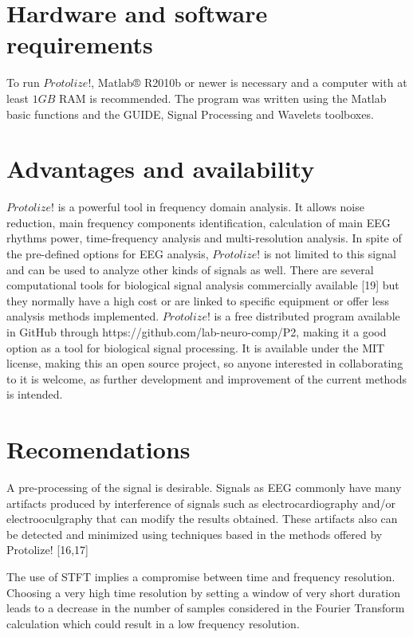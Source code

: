 \documentclass[12pt, a4paper]{article}
\begin{document}
\section{Hardware and software requirements}

To run $Protolize!$, Matlab® R2010b or newer is necessary and a computer with at least $1GB$ RAM is recommended. The program was written using the Matlab basic functions and the GUIDE, Signal Processing and Wavelets toolboxes.

\section{Advantages and availability}

$Protolize!$ is a powerful tool in frequency domain analysis. It allows noise reduction, main frequency components identification, calculation of main EEG rhythms power, time-frequency analysis and multi-resolution analysis. In spite of the pre-defined options for EEG analysis, $Protolize!$ is not limited to this signal and can be used to analyze other kinds of signals as well. There are several computational tools for biological signal analysis commercially available [19] but they normally have a high cost or are linked to specific equipment or offer less analysis methods implemented. $Protolize!$ is a free distributed program available in GitHub through https://github.com/lab-neuro-comp/P2, making it a good option as a tool for biological signal processing. It is available under the MIT license, making this an open source project, so anyone interested in collaborating to it is welcome, as further development and improvement of the current methods is intended.

\section{Recomendations}

A pre-processing of the signal is desirable. Signals as EEG commonly have many artifacts produced by interference of signals such as electrocardiography and/or electrooculgraphy that can modify the results obtained. These artifacts also can be detected and minimized using techniques based in the methods offered by Protolize! [16,17]

The use of STFT implies a compromise between time and frequency resolution. Choosing a very high time resolution by setting a window of very short duration leads to a decrease in the number of samples considered in the Fourier Transform calculation which could result in a low frequency resolution.
\end{document}
